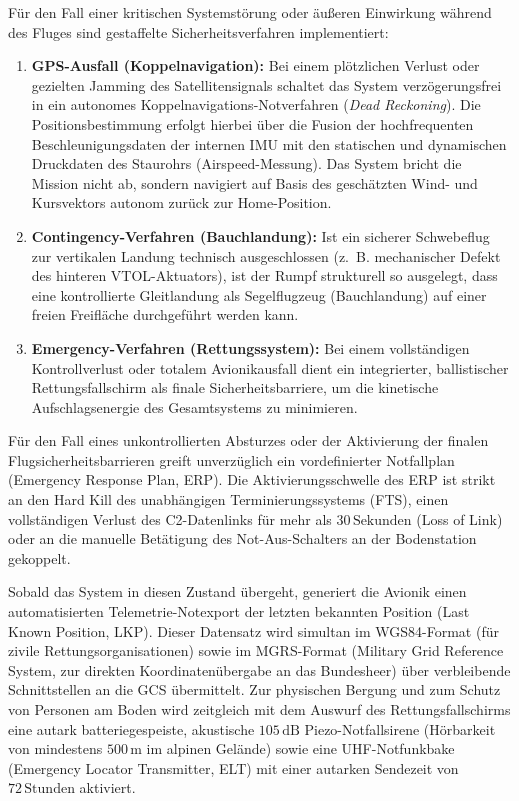 Für den Fall einer kritischen Systemstörung oder äußeren Einwirkung während des Fluges sind gestaffelte Sicherheitsverfahren implementiert:
\begin{enumerate}
    \item \textbf{GPS-Ausfall (Koppelnavigation):} Bei einem plötzlichen Verlust oder gezielten Jamming des Satellitensignals schaltet das System verzögerungsfrei in ein autonomes 
                                                   Koppelnavigations-Notverfahren (\textit{Dead Reckoning}). Die Positionsbestimmung erfolgt hierbei über die Fusion der hochfrequenten Beschleunigungsdaten 
                                                   der internen IMU mit den statischen und dynamischen Druckdaten des Staurohrs (Airspeed-Messung). Das System bricht die Mission nicht ab, 
                                                   sondern navigiert auf Basis des geschätzten Wind- und Kursvektors autonom zurück zur Home-Position.
    \item \textbf{Contingency-Verfahren (Bauchlandung):} Ist ein sicherer Schwebeflug zur vertikalen Landung technisch ausgeschlossen (z.~B. mechanischer Defekt des hinteren VTOL-Aktuators), 
                                                         ist der Rumpf strukturell so ausgelegt, dass eine kontrollierte Gleitlandung als Segelflugzeug (Bauchlandung) auf einer freien Freifläche durchgeführt werden kann.
    \item \textbf{Emergency-Verfahren (Rettungssystem):} Bei einem vollständigen Kontrollverlust oder totalem Avionikausfall dient ein integrierter, ballistischer Rettungsfallschirm als finale Sicherheitsbarriere, 
                                                         um die kinetische Aufschlagsenergie des Gesamtsystems zu minimieren.
\end{enumerate}

Für den Fall eines unkontrollierten Absturzes oder der Aktivierung der finalen Flugsicherheitsbarrieren greift unverzüglich ein vordefinierter Notfallplan (Emergency Response Plan, ERP). 
Die Aktivierungsschwelle des ERP ist strikt an den Hard Kill des unabhängigen Terminierungssystems (FTS), einen vollständigen Verlust des C2-Datenlinks für mehr als $30\,\text{Sekunden}$ (Loss of Link) 
oder an die manuelle Betätigung des Not-Aus-Schalters an der Bodenstation gekoppelt. 

Sobald das System in diesen Zustand übergeht, generiert die Avionik einen automatisierten Telemetrie-Notexport der letzten bekannten Position (Last Known Position, LKP). 
Dieser Datensatz wird simultan im WGS84-Format (für zivile Rettungsorganisationen) sowie im MGRS-Format (Military Grid Reference System, zur direkten Koordinatenübergabe an das Bundesheer) 
über verbleibende Schnittstellen an die GCS übermittelt. Zur physischen Bergung und zum Schutz von Personen am Boden wird zeitgleich mit dem Auswurf des Rettungsfallschirms eine autark batteriegespeiste, 
akustische $105\,\text{dB}$ Piezo-Notfallsirene (Hörbarkeit von mindestens $500\,\text{m}$ im alpinen Gelände) sowie eine UHF-Notfunkbake (Emergency Locator Transmitter, ELT) mit einer autarken Sendezeit von $72\,\text{Stunden}$ aktiviert.


